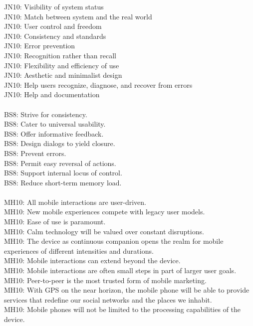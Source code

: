 {\color{red}
JN10: Visibility of system status\ \\
JN10: Match between system and the real world\ \\
JN10: User control and freedom\ \\
JN10: Consistency and standards\ \\
JN10: Error prevention\ \\
JN10: Recognition rather than recall\ \\
JN10: Flexibility and efficiency of use\ \\
JN10: Aesthetic and minimalist design\ \\
JN10: Help users recognize, diagnose, and recover from errors\ \\
JN10: Help and documentation\ \\
\ \\
BS8: Strive for consistency.\ \\
BS8: Cater to universal usability.\ \\
BS8: Offer informative feedback.\ \\
BS8: Design dialogs to yield closure.\ \\
BS8: Prevent errors.\ \\
BS8: Permit easy reversal of actions.\ \\
BS8: Support internal locus of control.\ \\
BS8: Reduce short-term memory load.\ \\
\ \\
MH10: All mobile interactions are user-driven. \ \\
MH10: New mobile experiences compete with legacy user models.  \ \\
MH10: Ease of use is paramount.  \ \\
MH10: Calm technology will be valued over constant disruptions.  \ \\
MH10: The device as continuous companion opens the realm for mobile experiences of different intensities and durations.  \ \\
MH10: Mobile interactions can extend beyond the device. \ \\
MH10: Mobile interactions are often small steps in part of larger user goals.  \ \\
MH10: Peer-to-peer is the most trusted form of mobile marketing.  \ \\
MH10: With GPS on the near horizon, the mobile phone will be able to provide services that redefine our social networks and the places we inhabit.  \ \\
MH10: Mobile phones will not be limited to the processing capabilities of the device. \ \\
}


